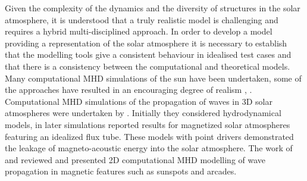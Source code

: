 \documentclass[linenumbers]{aastex63}
\begin{document}
Given the complexity of the dynamics and the diversity of structures in the solar atmosphere, it is understood that a truly realistic model is challenging and requires a hybrid multi-disciplined approach. In order to develop a model providing a representation of the solar atmosphere it is necessary to establish that the modelling tools give a consistent behaviour in idealised test cases and that there is a consistency between the computational and theoretical models. Many computational MHD simulations of the sun have been undertaken, some of the approaches have resulted in an encouraging degree of realism  \citet{Vogler2005}, \citet{Gudiksen2011}. Computational MHD simulations of the propagation of waves in 3D solar atmospheres were undertaken by \citet{Fedun2009a}. Initially they considered hydrodynamical models, in later simulations \citet{Fedun2009b} \citet{Vigeesh2012} reported results for magnetized solar atmospheres featuring an idealized flux tube. These models with point drivers demonstrated the leakage of magneto-acoustic energy into the solar atmosphere. The work of \citet{Khomenko2013} and  \citet{Santamaria2015} reviewed and presented 2D computational MHD modelling of wave propagation in magnetic features such as sunspots and arcades. 



\end{document}
